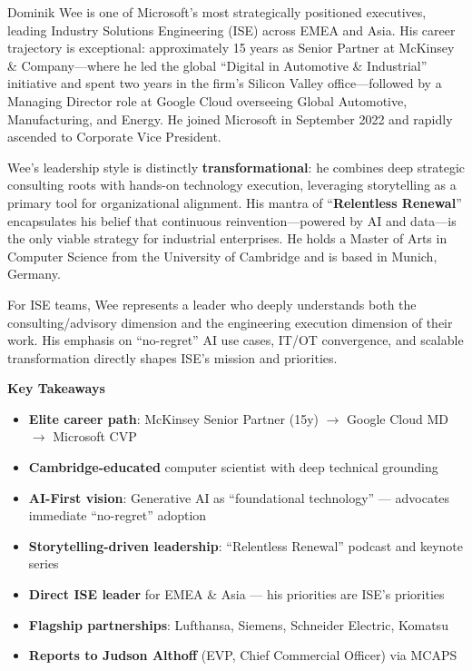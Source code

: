 \documentclass[11pt,a4paper]{article}
\begin{document}
\vspace{12pt}

Dominik Wee is one of Microsoft's most strategically positioned executives, leading Industry Solutions Engineering (ISE) across EMEA and Asia. His career trajectory is exceptional: approximately 15 years as Senior Partner at McKinsey \& Company---where he led the global ``Digital in Automotive \& Industrial'' initiative and spent two years in the firm's Silicon Valley office---followed by a Managing Director role at Google Cloud overseeing Global Automotive, Manufacturing, and Energy. He joined Microsoft in September 2022 and rapidly ascended to Corporate Vice President.

Wee's leadership style is distinctly \textbf{transformational}: he combines deep strategic consulting roots with hands-on technology execution, leveraging storytelling as a primary tool for organizational alignment. His mantra of ``\textbf{Relentless Renewal}'' encapsulates his belief that continuous reinvention---powered by AI and data---is the only viable strategy for industrial enterprises. He holds a Master of Arts in Computer Science from the University of Cambridge and is based in Munich, Germany.

For ISE teams, Wee represents a leader who deeply understands both the consulting/advisory dimension and the engineering execution dimension of their work. His emphasis on ``no-regret'' AI use cases, IT/OT convergence, and scalable transformation directly shapes ISE's mission and priorities.

\vspace{12pt}

\begin{tcolorbox}[
    colback=mslightgray,
    colframe=msblue,
    boxrule=1pt,
    arc=3pt,
    left=10pt, right=10pt, top=8pt, bottom=8pt
]
\textbf{Key Takeaways}
\begin{itemize}
    \item \textbf{Elite career path}: McKinsey Senior Partner (15y) $\rightarrow$ Google Cloud MD $\rightarrow$ Microsoft CVP
    \item \textbf{Cambridge-educated} computer scientist with deep technical grounding
    \item \textbf{AI-First vision}: Generative AI as ``foundational technology'' --- advocates immediate ``no-regret'' adoption
    \item \textbf{Storytelling-driven leadership}: ``Relentless Renewal'' podcast and keynote series
    \item \textbf{Direct ISE leader} for EMEA \& Asia --- his priorities are ISE's priorities
    \item \textbf{Flagship partnerships}: Lufthansa, Siemens, Schneider Electric, Komatsu
    \item \textbf{Reports to Judson Althoff} (EVP, Chief Commercial Officer) via MCAPS
\end{itemize}
\end{tcolorbox}
\end{document}
